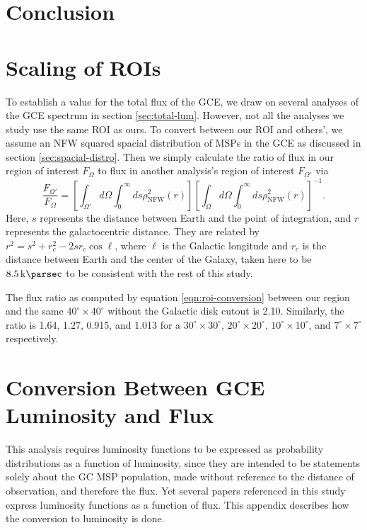 \documentclass[a4paper,11pt]{article}
\newcommand{\brackets}[1]{\left[#1\right]}
\newcommand{\comment}[1]{\emph{\color{red}{#1}}}
\begin{document}
\section{Conclusion}



\appendix
\section{Scaling of ROIs}
\label{sec:scale-rois}
To establish a value for the total flux of the GCE, we draw on several analyses of the GCE spectrum in section \ref{sec:total-lum}. However, not all the analyses we study use the same ROI as ours. To convert between our ROI and others', we assume an NFW squared spacial distribution of MSPs in the GCE as discussed in section \ref{sec:spacial-distro}. Then we simply calculate the ratio of flux in our region of interest $F_\Omega$ to flux in another analysis's region of interest $F_{\Omega'}$ via
\begin{equation}
    \frac{F_{\Omega'}}{F_\Omega} = \brackets{\int_{\Omega'}d\Omega\int_0^\infty ds \rho_\text{NFW}^2 (r)}\brackets{\int_{\Omega}d\Omega\int_0^\infty ds \rho_\text{NFW}^2 (r)}^{-1}.
    \label{eqn:roi-conversion}
\end{equation}
Here, $s$ represents the distance between Earth and the point of integration, and $r$ represents the galactocentric distance. They are related by $r^2 = s^2 + r_c^2 - 2 s r_c \cos\ell$, where $\ell$ is the Galactic longitude and $r_c$ is the distance between Earth and the center of the Galaxy, taken here to be $\SI{8.5}{\kilo\parsec}$ to be consistent with the rest of this study.

The flux ratio as computed by equation \ref{eqn:roi-conversion} between our region and the same $40^\circ \times 40^\circ$ without the Galactic disk cutout is 2.10. Similarly, the ratio is 1.64, 1.27, 0.915, and 1.013 \comment{Wrong!} for a $30^\circ \times 30^\circ $, $20^\circ \times 20^\circ$, $10^\circ \times 10^\circ$, and $7^\circ \times 7^\circ$ respectively.


\section{Conversion Between GCE Luminosity and Flux}
\label{app:lum-to-flux}
This analysis requires luminosity functions to be expressed as probability distributions as a function of luminosity, since they are intended to be statements solely about the GC MSP population, made without reference to the distance of observation, and therefore the flux. Yet several papers referenced in this study express luminosity functions as a function of flux. This appendix describes how the conversion to luminosity is done.
\end{document}
